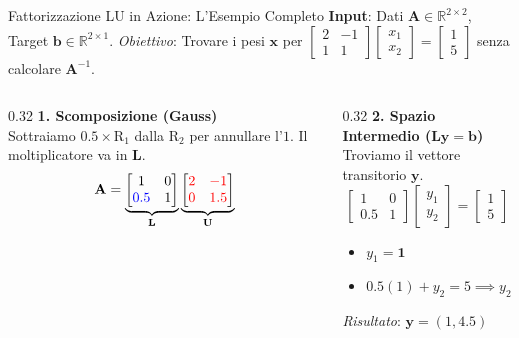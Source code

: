 \documentclass[aspectratio=169, 10pt]{beamer}
\begin{document}
\begin{frame}{Fattorizzazione LU in Azione: L'Esempio Completo}
    \scriptsize
    \textbf{Input}: Dati $\mathbf{A} \in \mathbb{R}^{2\times2}$, Target $\mathbf{b} \in \mathbb{R}^{2\times1}$. \textit{Obiettivo}: Trovare i pesi $\mathbf{x}$ per $\begin{bmatrix} 2 & -1 \\ 1 & 1 \end{bmatrix} \begin{bmatrix} x_1 \\ x_2 \end{bmatrix} = \begin{bmatrix} 1 \\ 5 \end{bmatrix}$ senza calcolare $\mathbf{A}^{-1}$.
    
    \vspace{0.2cm}
    \begin{columns}[T,onlytextwidth]
        \begin{column}{0.32\textwidth}
            \textbf{1. Scomposizione (Gauss)} \\
            Sottraiamo $0.5 \times \text{R}_1$ dalla $\text{R}_2$ per annullare l'$1$. Il moltiplicatore va in $\mathbf{L}$.
            \[
            \mathbf{A} =
            \underbrace{\begin{bmatrix} 1 & 0 \\ \color{blue}0.5 & 1 \end{bmatrix}}_{\mathbf{L}}
            \underbrace{\begin{bmatrix} \color{red}2 & \color{red}-1 \\ \color{red}0 & \color{red}1.5 \end{bmatrix}}_{\mathbf{U}}
            \]
        \end{column}
        
        \begin{column}{0.32\textwidth}
            \textbf{2. Spazio Intermedio ($\mathbf{Ly} = \mathbf{b}$)} \\
            Troviamo il vettore transitorio $\mathbf{y}$.
            \[
            \begin{bmatrix} 1 & 0 \\ 0.5 & 1 \end{bmatrix} \begin{bmatrix} y_1 \\ y_2 \end{bmatrix} = \begin{bmatrix} 1 \\ 5 \end{bmatrix}
            \]
            \vspace{-0.3cm} %
            \begin{itemize}
                \setlength\itemsep{0.05em}
                \item $y_1 = \mathbf{1}$
                \item $0.5(1) + y_2 = 5 \implies y_2 = \mathbf{4.5}$
            \end{itemize}
            \textit{Risultato}: $\mathbf{y} = (1, 4.5)$
        \end{column}
        

\end{columns}
\end{frame}
\end{document}

